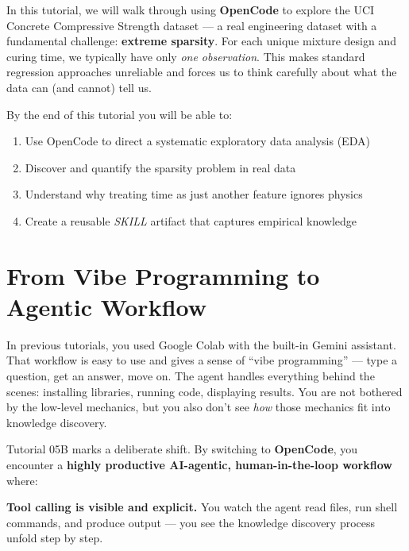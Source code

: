 \documentclass[11pt]{article}
\begin{document}
\begin{ch-box}
In this tutorial, we will walk through using \textbf{OpenCode} to explore the UCI Concrete Compressive Strength dataset --- a real engineering dataset with a fundamental challenge: \textbf{extreme sparsity}.  For each unique mixture design and curing time, we typically have only \emph{one observation}.  This makes standard regression approaches unreliable and forces us to think carefully about what the data can (and cannot) tell us.

By the end of this tutorial you will be able to:
\begin{enumerate}[nosep]
  \item Use OpenCode to direct a systematic exploratory data analysis (EDA)
  \item Discover and quantify the sparsity problem in real data
  \item Understand why treating time as just another feature ignores physics
  \item Create a reusable \emph{SKILL} artifact that captures empirical knowledge
\end{enumerate}
\end{ch-box}

\section{From Vibe Programming to Agentic Workflow}
\label{sec:vibe-to-agentic}

In previous tutorials, you used Google Colab with the built-in Gemini assistant. That workflow is easy to use and gives a sense of ``vibe programming'' --- type a question, get an answer, move on. The agent handles everything behind the scenes: installing libraries, running code, displaying results. You are not bothered by the low-level mechanics, but you also don't see \emph{how} those mechanics fit into knowledge discovery.

Tutorial 05B marks a deliberate shift. By switching to \textbf{OpenCode}, you encounter a \textbf{highly productive AI-agentic, human-in-the-loop workflow} where:

\begin{def-box}
\textbf{Tool calling is visible and explicit.}  You watch the agent read files, run shell commands, and produce output --- you see the knowledge discovery process unfold step by step.
\end{def-box}
\end{document}
